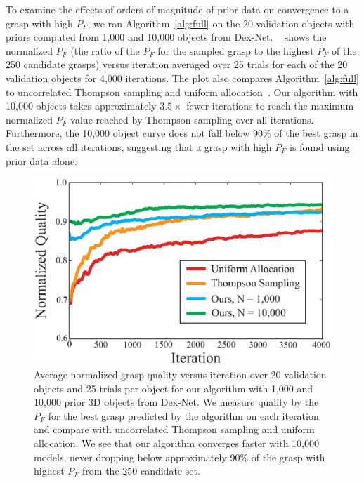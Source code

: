 To examine the effects of orders of magnitude of prior data on convergence to a grasp with high $P_F$, we ran Algorithm~\ref{alg:full} on the 20 validation objects with priors computed from 1,000 and 10,000 objects from Dex-Net. 
~ shows the normalized $P_F$ (the ratio of the $P_F$ for the sampled grasp to the highest $P_F$ of the 250 candidate grasps) versus iteration averaged over 25 trials for each of the 20 validation objects for 4,000 iterations.
The plot also compares Algorithm~\ref{alg:full} to uncorrelated Thompson sampling and uniform allocation~\cite{laskey2015bandits}.
Our algorithm with 10,000 objects takes approximately $3.5\times$ fewer iterations to reach the maximum normalized $P_F$ value reached by Thompson sampling over all iterations.
Furthermore, the 10,000 object curve does not fall below 90\% of the best grasp in the set across all iterations, suggesting that a grasp with high $P_F$ is found using prior data alone.

\begin{figure}[t!]
\centering
\includegraphics[scale=0.45]{figures/illustrations/avg_reward.eps}
\caption{Average normalized grasp quality versus iteration over 20 validation objects and 25 trials per object for our algorithm with 1,000 and 10,000 prior 3D objects from Dex-Net. We measure quality by the $P_F$ for the best grasp predicted by the algorithm on each iteration and compare with uncorrelated Thompson sampling and uniform allocation. We see that our algorithm converges faster with 10,000 models, never dropping below approximately 90\% of the grasp with highest $P_F$ from the 250 candidate set.}
\vspace*{-15pt}
\end{figure}

